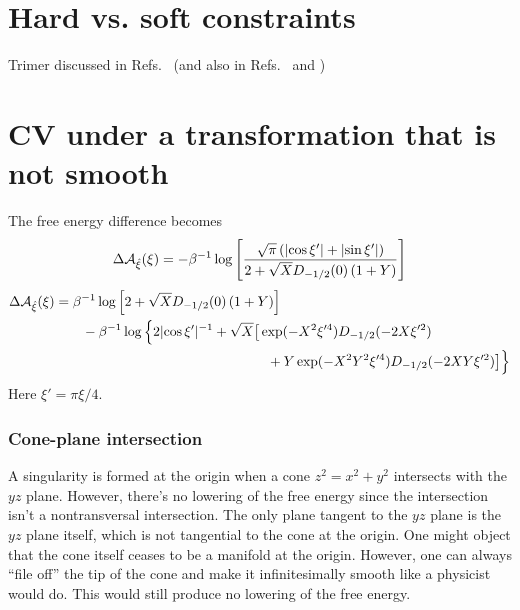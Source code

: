 \section{Hard vs. soft constraints}

Trimer discussed in Refs.~\cite{kampen1981,kampen1984} (and also in Refs.~\cite[Section 15.1]{frenkel2001} and \cite{walter2011}) 

\section{CV under a transformation that is not smooth}

The free energy difference becomes
%
\begin{equation}
  \Delta\mathcal{A}_{\hat{\xi}}(\xi) = -\beta^{-1}\log\left[\frac{\sqrt{\pi}\left(\lvert\cos\xi'\rvert + \lvert\sin\xi'\rvert\right)}{2 + \sqrt{X}D_{-1/2}(0)\left(1 + Y\right)}\right]
\end{equation}
\begin{equation}
  \begin{aligned}
    \Delta\free{\xi} &= \beta^{-1}\log\left[2 + \sqrt{X}D_{-1/2}(0)\left(1 + Y\right)\right] \\
                     &\qquad -\beta^{-1}\log\Big\{2\abs{\cos\xi'}^{-1} + \sqrt{X}\big[\exp(-X^{2}\xi'^{4})D_{-1/2}(-2X\xi'^{2})\\
                     & \phantom{\qquad-\beta^{-1}\log\Big\{2\abs{\cos\xi'}^{-1} + \sqrt{X}\big[}
                 \quad+Y\exp(-X^{2}Y^{2}\xi'^{4})D_{-1/2}(-2XY\xi'^{2})\big]\Big\}   \end{aligned}
\end{equation}
%
Here $\xi' = \pi\xi/4$.

\subsubsection{Cone-plane intersection}

A singularity is formed at the origin when a cone $z^2 = x^2 + y^2$ intersects with the $yz$ plane.
However, there's no lowering of the free energy since the intersection isn't a nontransversal intersection.
The only plane tangent to the $yz$ plane is the $yz$ plane itself, which is not tangential to the cone at the origin.
One might object that the cone itself ceases to be a manifold at the origin.
However, one can always ``file off'' the tip of the cone and make it infinitesimally smooth like a physicist would do.
This would still produce no lowering of the free energy.
